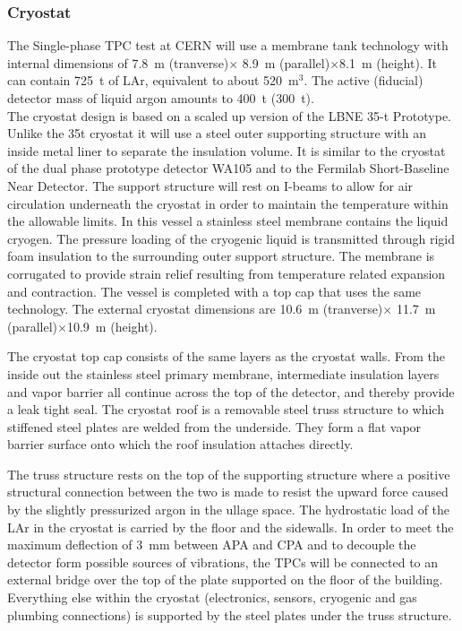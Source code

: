 \subsubsection{Cryostat}

The Single-phase TPC test at CERN will use a membrane tank technology
with internal dimensions of 7.8~m (tranverse)$\times$ 8.9~m
(parallel)$\times$8.1~m (height).  It can contain 725~t of LAr,
equivalent to about 520~m$^3$. The active (fiducial) detector mass of
liquid argon amounts to 400~t (300~t).\\ The cryostat design is
based on a scaled up version of the LBNE 35-t
Prototype\cite{montanari_35ton}.  Unlike the 35t cryostat it will use
a steel outer supporting structure with an inside metal liner to
separate the insulation volume. It is similar to the cryostat of the
dual phase prototype detector WA105 and to the Fermilab Short-Baseline
Near Detector. The support structure will rest on I-beams to allow for
air circulation underneath the cryostat in order to maintain the
temperature within the allowable limits.  In this vessel a stainless
steel membrane contains the liquid cryogen. The pressure loading of
the cryogenic liquid is transmitted through rigid foam insulation to
the surrounding outer support structure. The membrane is corrugated to
provide strain relief resulting from temperature related expansion and
contraction. The vessel is completed with a top cap that uses the same
technology.  The external cryostat dimensions are 10.6~m
(tranverse)$\times$ 11.7~m (parallel)$\times$10.9~m (height).


The cryostat top cap consists of the same layers as the cryostat
walls. From the inside out the stainless steel primary membrane,
intermediate insulation layers and vapor barrier all continue across
the top of the detector, and thereby provide a leak tight seal.  The
cryostat roof is a removable steel truss structure to which stiffened
steel plates are welded from the underside. They form a flat vapor
barrier surface onto which the roof insulation attaches directly.

The truss structure rests on the top of the supporting structure where
a positive structural connection between the two is made to resist the
upward force caused by the slightly pressurized argon in the ullage
space. The hydrostatic load of the LAr in the cryostat is carried by
the floor and the sidewalls. In order to meet the maximum deflection
of 3~mm between APA and CPA and to decouple the detector form possible
sources of vibrations, the TPCs will be connected to an external
bridge over the top of the plate supported on the floor of the
building. Everything else within the cryostat (electronics, sensors,
cryogenic and gas plumbing connections) is supported by the steel
plates under the truss structure.

